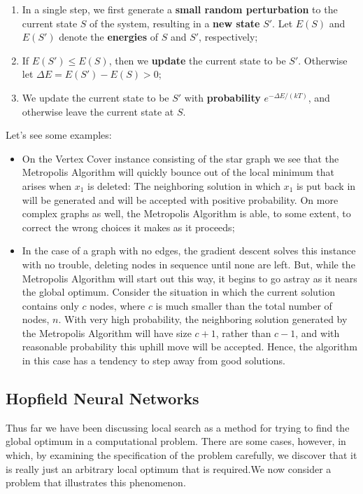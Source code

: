 \begin{enumerate}
    \item In a single step, we first generate a \textbf{small random perturbation} to the current state $S$ of the system, resulting in a \textbf{new state} $S'$. Let $E(S)$ and $E(S')$ denote the \textbf{energies} of $S$ and $S'$, respectively;
    \item If $E(S') \leq E(S)$, then we \textbf{update} the current state to be $S'$. Otherwise let $\Delta E = E(S') - E(S) > 0$;
    \item We update the current state to be $S'$ with \textbf{probability} $e^{-\Delta E/(kT)}$, and otherwise leave the current state at $S$.
\end{enumerate}

Let's see some examples:
\begin{itemize}
    \item On the Vertex Cover instance consisting of the star graph we see that the Metropolis Algorithm will quickly bounce out of the local minimum that arises when $x_1$ is deleted: The neighboring solution in which $x_1$ is put back in will be generated and will be accepted with positive probability. On more complex graphs as well, the Metropolis Algorithm is able, to some extent, to correct the wrong choices it makes as it proceeds;
    \item In the case of a graph with no edges, the gradient descent solves this instance with no trouble, deleting nodes in sequence until none are left. But, while the Metropolis Algorithm will start out this way, it begins to go astray as it nears the global optimum. Consider the situation in which the current solution contains only $c$ nodes, where $c$ is much smaller than the total number of nodes, $n$. With very high probability, the neighboring solution generated by the Metropolis Algorithm will have size $c + 1$, rather than $c-1$, and with reasonable probability this uphill move will be accepted. Hence, the algorithm in this case has a tendency to step away from good solutions.
\end{itemize}

\subsection{Hopfield Neural Networks}
Thus far we have been discussing local search as a method for trying to find the global optimum in a computational problem. There are some cases, however, in which, by examining the specification of the problem carefully, we discover that it is really just an arbitrary local optimum that is required.We now consider a problem that illustrates this phenomenon.

